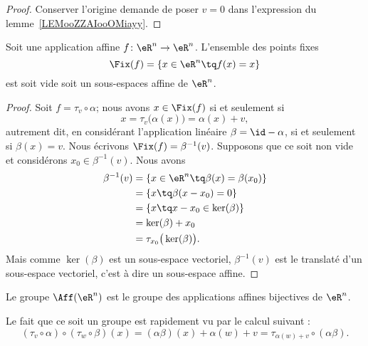 \begin{proof}
    Conserver l'origine demande de poser \( v=0\) dans l'expression du lemme~\ref{LEMooZZAIooOMiayy}.
\end{proof}

\begin{proposition}     \label{PROPooYRCJooIcmUVI}
    Soit une application affine \( f\colon \eR^n\to \eR^n\). L'ensemble des points fixes
    \begin{equation}
        \Fix(f)=\{ x\in \eR^n\tq f(x)=x \}
    \end{equation}
    est soit vide soit un sous-espaces affine de \( \eR^n\).
\end{proposition}

\begin{proof}
    Soit \( f=\tau_v\circ \alpha\); nous avons \( x\in\Fix(f)\) si et seulement si
    \begin{equation}
        x=\tau_v\big( \alpha(x) \big)=\alpha(x)+v,
    \end{equation}
    autrement dit, en considérant l'application linéaire \( \beta=\id-\alpha\), si et seulement si \( \beta(x)=v\). Nous écrivons \( \Fix(f)=\beta^{-1}(v)\). Supposons que ce soit non vide et considérons \( x_0\in\beta^{-1}(v)\). Nous avons
    \begin{subequations}
        \begin{align}
            \beta^{-1}(v)&=\{ x\in \eR^n\tq \beta(x)=\beta(x_0) \}\\
            &=\{ x\tq \beta(x-x_0)=0 \}\\
            &=\{ x\tq x-x_0\in \ker(\beta) \}\\
            &=\ker(\beta)+x_0\\
            &=\tau_{x_0}\big( \ker(\beta) \big).
        \end{align}
    \end{subequations}
    Mais comme \( \ker(\beta)\) est un sous-espace vectoriel, \( \beta^{-1}(v)\) est le translaté d'un sous-espace vectoriel, c'est à dire un sous-espace affine.
\end{proof}

\begin{definition}
    Le groupe \( \Aff(\eR^n)\) est le groupe des applications affines bijectives de \( \eR^n\).
\end{definition}

\begin{remark}
    Le fait que ce soit un groupe est rapidement vu par le calcul suivant :
    \begin{equation}
        (\tau_v\circ\alpha)\circ(\tau_w\circ\beta)(x)=(\alpha\beta)(x)+\alpha(w)+v=\tau_{\alpha(w)+v}\circ(\alpha\beta).
    \end{equation}
\end{remark}

